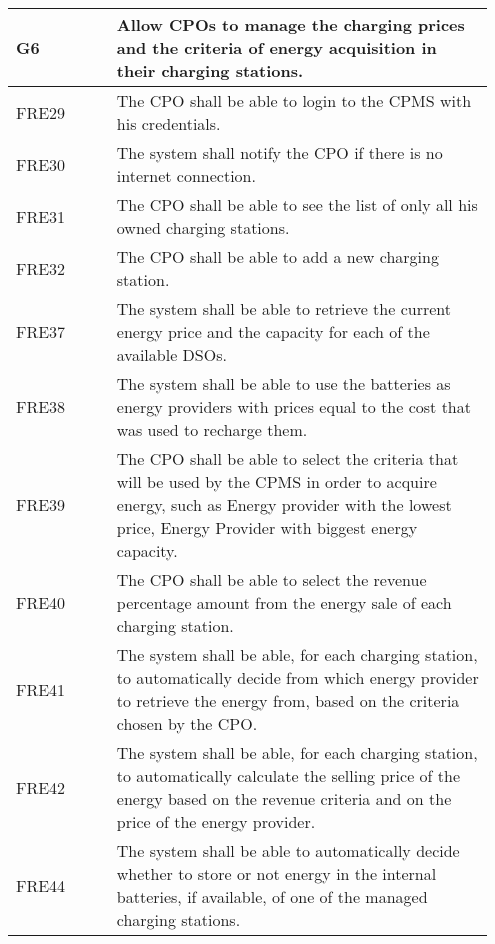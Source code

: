 {\renewcommand{\arraystretch}{1.5}
\begin{longtable}{|p{0.20\linewidth}p{0.75\linewidth} |}
    \hline
    \rowcolor{bluepoli!40}\textbf{G6} & \textbf{Allow CPOs to manage the charging prices and the criteria of energy acquisition in their charging stations.} \\
    \hline
    \rowcolor{bluepoli!15} FRE29 & The CPO shall be able to login to the CPMS with his credentials. \\
    \hline
    \rowcolor{bluepoli!15} FRE30 & The system shall notify the CPO if there is no internet connection. \\
    \hline
    \rowcolor{bluepoli!15} FRE31 & The CPO shall be able to see the list of only all his owned charging stations. \\
    \hline
    \rowcolor{bluepoli!15} FRE32 & The CPO shall be able to add a new charging station. \\
    \hline
    \rowcolor{bluepoli!15} FRE37 & The system shall be able to retrieve the current energy price and the capacity for each of the available DSOs. \\
    \hline
     \rowcolor{bluepoli!15} FRE38 & The system shall be able to use the batteries as energy providers with prices equal to the cost that was used to recharge them. \\
    \hline
     \rowcolor{bluepoli!15} FRE39& The CPO shall be able to select the criteria that will be used by the CPMS in order to acquire energy, such as Energy provider with the lowest price, Energy Provider with biggest energy capacity.\\
     \rowcolor{bluepoli!15} FRE40 & The CPO shall be able to select the revenue percentage amount from the energy sale of each charging station.\\
    \hline
    \rowcolor{bluepoli!15} FRE41 & The system shall be able, for each charging station, to automatically decide from which energy provider to retrieve the energy from, based on the criteria chosen by the CPO.\\
    \hline
    \rowcolor{bluepoli!15} FRE42 & The system shall be able, for each charging station, to automatically calculate the selling price of the energy based on the revenue criteria and on the price of the energy provider.\\
    \hline 
    \rowcolor{bluepoli!15} FRE44 &  The system shall be able to automatically decide whether to store or not energy in the internal batteries, if available, of one of the managed charging stations.\\

\end{longtable}}
